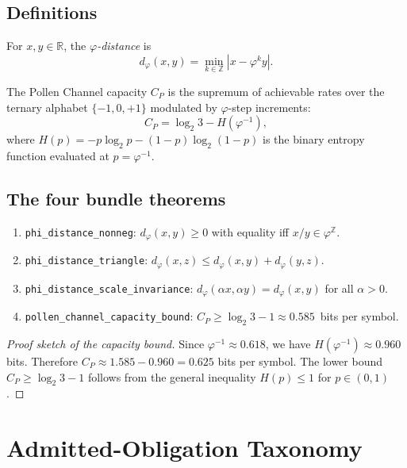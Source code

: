 \subsection{Definitions}

\begin{definition}
  For $x, y \in \mathbb{R}$, the \emph{$\varphi$-distance} is
  \[
    d_\varphi(x, y) = \min_{k \in \mathbb{Z}} |x - \varphi^k y|.
  \]
\end{definition}

\begin{definition}
  The Pollen Channel capacity $C_P$ is the supremum of achievable rates
  over the ternary alphabet $\{-1, 0, +1\}$ modulated by $\varphi$-step
  increments:
  \[
    C_P = \log_2 3 - H(\varphi^{-1}),
  \]
  where $H(p) = -p\log_2 p - (1-p)\log_2(1-p)$ is the binary entropy
  function evaluated at $p = \varphi^{-1}$.
\end{definition}

\subsection{The four bundle theorems}

\begin{enumerate}
  \item \texttt{phi\_distance\_nonneg}: $d_\varphi(x,y) \geq 0$ with
        equality iff $x/y \in \varphi^\mathbb{Z}$.
  \item \texttt{phi\_distance\_triangle}:
        $d_\varphi(x,z) \leq d_\varphi(x,y) + d_\varphi(y,z)$.
  \item \texttt{phi\_distance\_scale\_invariance}:
        $d_\varphi(\alpha x, \alpha y) = d_\varphi(x,y)$ for all
        $\alpha > 0$.
  \item \texttt{pollen\_channel\_capacity\_bound}:
        $C_P \geq \log_2 3 - 1 \approx 0.585$~bits per symbol.
\end{enumerate}

\begin{proof}[Proof sketch of the capacity bound]
  Since $\varphi^{-1} \approx 0.618$, we have
  $H(\varphi^{-1}) \approx 0.960$ bits. Therefore
  $C_P \approx 1.585 - 0.960 = 0.625$ bits per symbol. The lower bound
  $C_P \geq \log_2 3 - 1$ follows from the general inequality
  $H(p) \leq 1$ for $p \in (0,1)$.
\end{proof}

\section{Admitted-Obligation Taxonomy}
\label{sec:ext:admitted-taxonomy}

